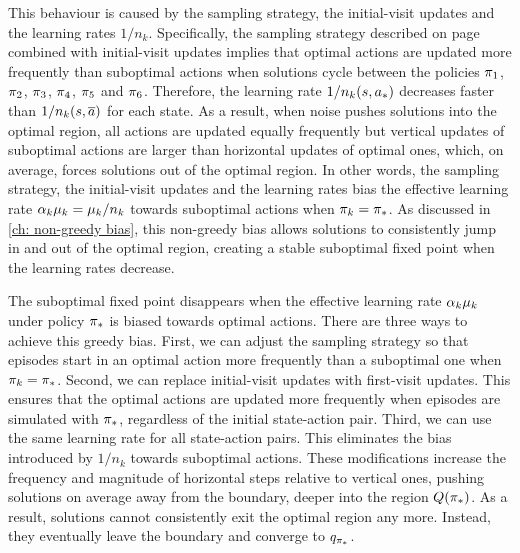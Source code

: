 This behaviour is caused by the sampling strategy, the initial-visit updates and the learning rates $1/n_k$.
Specifically, the sampling strategy described 
on page \pageref{pg: sampling strat 3 states}
combined with initial-visit updates implies that optimal actions are updated more frequently than suboptimal actions when solutions cycle between the policies $\pi_1$, $\pi_2$, $\pi_3$, $\pi_4$, $\pi_5$ and $\pi_6$.
Therefore, the learning rate $1/n_k(s, {a}_*)$ decreases faster than $1/n_k(s, \overline{a})$ for each state.
As a result, when noise pushes solutions into the optimal region, all actions are updated equally frequently but vertical updates of suboptimal actions are larger than horizontal updates of optimal ones,
which, on average, forces solutions out of the optimal region.
In other words, the sampling strategy, the initial-visit updates and the learning rates bias the effective learning rate $\alpha_k \mu_k = \mu_k / n_k$ towards suboptimal actions when $\pi_k = {\pi}_*$. As discussed in \autoref{ch: non-greedy bias}, this non-greedy bias allows solutions to consistently jump in and out of the optimal region, creating a stable suboptimal fixed point when the learning rates decrease.




The suboptimal fixed point disappears when the effective learning rate $\alpha_k \mu_k$ under policy ${\pi}_*$ is biased towards optimal actions.
There are three ways to achieve this greedy bias.
First, we can adjust the sampling strategy so that episodes start in an optimal action more frequently than a suboptimal one when $\pi_k = {\pi}_*$.
Second, we can replace initial-visit updates with first-visit updates. This ensures that the optimal actions are updated more frequently when episodes are simulated with ${\pi}_*$, regardless of the initial state-action pair.
Third, we can use the same learning rate for all state-action pairs. This eliminates the bias introduced by $1/n_k$ towards suboptimal actions.
These modifications increase the frequency and magnitude of horizontal steps relative to vertical ones,
pushing solutions on average away from the boundary, deeper into the region $Q({\pi}_*)$.
As a result, solutions cannot consistently exit the optimal region any more. Instead, they eventually leave the boundary and converge to $q_{{\pi}_*}$.


